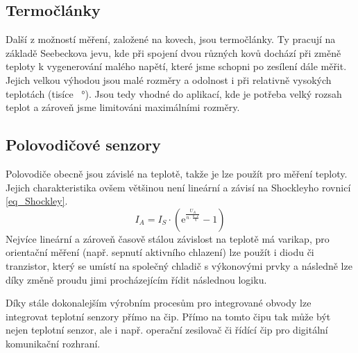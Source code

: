 \subsection{Termočlánky}

Další z možností měření, založené na kovech, jsou termočlánky. Ty pracují na základě Seebeckova jevu, kde při spojení dvou různých kovů dochází při změně teploty k vygenerování malého napětí, které jsme schopni po zesílení dále měřit. Jejich velkou výhodou jsou malé rozměry a odolnost i při relativně vysokých teplotách (tisíce \SI{}{\degree}). Jsou tedy vhodné do aplikací, kde je potřeba velký rozsah teplot a zároveň jsme limitováni maximálními rozměry.

\subsection{Polovodičové senzory}

Polovodiče obecně jsou závislé na teplotě, takže je lze použít pro měření teploty. Jejich charakteristika ovšem většinou není lineární a závisí na Shockleyho rovnicí \eqref{eq_Shockley}.
\begin{equation}
    I_A =I_S \cdot (\mathrm{e} ^{\frac{U_A}{n \cdot \frac{k \cdot T}{q}}} - 1)
    \label{eq_Shockley}
\end{equation}
Nejvíce lineární a zároveň časově stálou závislost na teplotě má varikap, pro orientační měření (např. sepnutí aktivního chlazení) lze použít i diodu či tranzistor, který se umístí na společný chladič s výkonovými prvky a následně lze díky změně proudu jimi procházejícím řídit následnou logiku.

Díky stále dokonalejším výrobním procesům pro integrované obvody lze integrovat teplotní senzory přímo na čip. Přímo na tomto čipu tak může být nejen teplotní senzor, ale i např. operační zesilovač či řídící čip pro digitální komunikační rozhraní.
